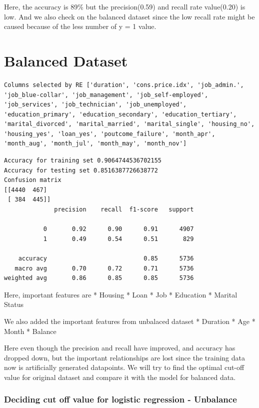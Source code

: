 \documentclass[
  letterpaper,
  DIV=11,
  numbers=noendperiod]{scrartcl}
\begin{document}
Here, the accuracy is 89\% but the precision(0.59) and recall rate
value(0.20) is low. And we also check on the balanced dataset since the
low recall rate might be caused because of the less number of y = 1
value.

\hypertarget{balanced-dataset}{%
\section{Balanced Dataset}\label{balanced-dataset}}

\begin{verbatim}
Columns selected by RE ['duration', 'cons.price.idx', 'job_admin.', 'job_blue-collar', 'job_management', 'job_self-employed', 'job_services', 'job_technician', 'job_unemployed', 'education_primary', 'education_secondary', 'education_tertiary', 'marital_divorced', 'marital_married', 'marital_single', 'housing_no', 'housing_yes', 'loan_yes', 'poutcome_failure', 'month_apr', 'month_aug', 'month_jul', 'month_may', 'month_nov']
\end{verbatim}

\begin{verbatim}
Accuracy for training set 0.9064744536702155
Accuracy for testing set 0.8516387726638772
Confusion matrix 
[[4440  467]
 [ 384  445]]
              precision    recall  f1-score   support

           0       0.92      0.90      0.91      4907
           1       0.49      0.54      0.51       829

    accuracy                           0.85      5736
   macro avg       0.70      0.72      0.71      5736
weighted avg       0.86      0.85      0.85      5736
\end{verbatim}

Here, important features are * Housing * Loan * Job * Education *
Marital Status

We also added the important features from unbalaced dataset * Duration *
Age * Month * Balance

Here even though the precision and recall have improved, and accuracy
has dropped down, but the important relationships are lost since the
training data now is artificially generated datapoints. We will try to
find the optimal cut-off value for original dataset and compare it with
the model for balanced data.

\hypertarget{deciding-cut-off-value-for-logistic-regression---unbalance}{%
\subsubsection{Deciding cut off value for logistic regression -
Unbalance}\label{deciding-cut-off-value-for-logistic-regression---unbalance}}
\end{document}

